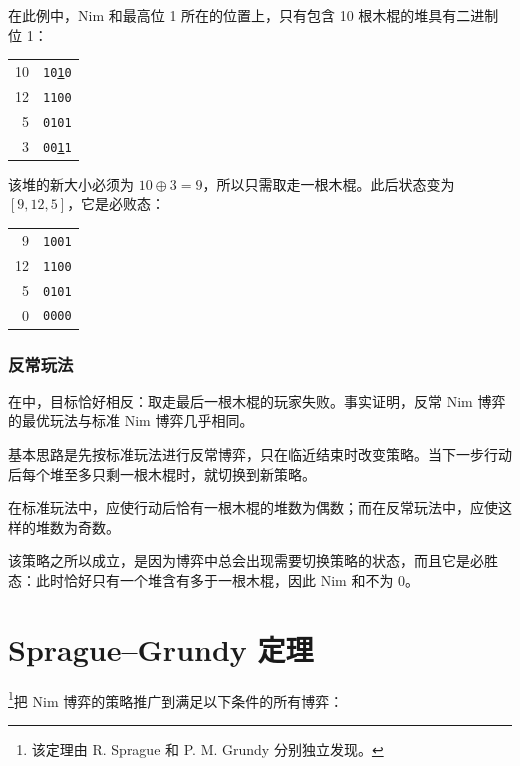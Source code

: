 在此例中，Nim 和最高位 1 所在的位置上，只有包含 10 根木棍的堆具有二进制位 1：

\begin{center}
\begin{tabular}{r|r}
10 & \texttt{10\underline{1}0} \\
12 & \texttt{1100} \\
5 & \texttt{0101} \\
\hline
3 & \texttt{00\underline{1}1} \\
\end{tabular}
\end{center}

该堆的新大小必须为 $10 \oplus 3 = 9$，所以只需取走一根木棍。此后状态变为 $[9,12,5]$，它是必败态：

\begin{center}
\begin{tabular}{r|r}
9 & \texttt{1001} \\
12 & \texttt{1100} \\
5 & \texttt{0101} \\
\hline
0 & \texttt{0000} \\
\end{tabular}
\end{center}

\subsubsection{反常玩法}


在中，目标恰好相反：取走最后一根木棍的玩家失败。事实证明，反常 Nim 博弈的最优玩法与标准 Nim 博弈几乎相同。

基本思路是先按标准玩法进行反常博弈，只在临近结束时改变策略。当下一步行动后每个堆至多只剩一根木棍时，就切换到新策略。

在标准玩法中，应使行动后恰有一根木棍的堆数为偶数；而在反常玩法中，应使这样的堆数为奇数。

该策略之所以成立，是因为博弈中总会出现需要切换策略的状态，而且它是必胜态：此时恰好只有一个堆含有多于一根木棍，因此 Nim 和不为 0。

\section{Sprague--Grundy 定理}


\footnote{该定理由 R. Sprague \cite{spr35} 和 P. M. Grundy \cite{gru39} 分别独立发现。}把 Nim 博弈的策略推广到满足以下条件的所有博弈：

